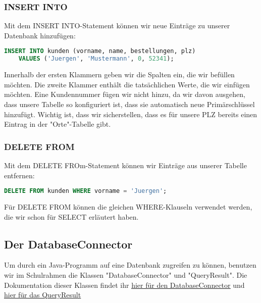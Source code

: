 \documentclass{article}
\begin{document}
	\subsubsection{INSERT INTO}
	Mit dem INSERT INTO-Statement können wir neue Einträge zu unserer Datenbank hinzufügen:

	\begin{lstlisting}[language=SQL, caption=Wir fügen neue Einträge zu der Kunden-Tabelle hinzu]
	INSERT INTO kunden (vorname, name, bestellungen, plz) 
	VALUES ('Juergen', 'Mustermann', 0, 52341);
	\end{lstlisting}

	Innerhalb der ersten Klammern geben wir die Spalten ein, die wir befüllen möchten. Die zweite Klammer enthält die tatsächlichen Werte, die wir einfügen möchten. Eine Kundennummer fügen wir nicht hinzu, da wir davon ausgehen, dass unsere Tabelle so konfiguriert ist, dass sie automatisch neue Primärschlüssel hinzufügt. Wichtig ist, dass wir sicherstellen, dass es für unsere PLZ bereits einen Eintrag in der "Orte"-Tabelle gibt.

	\subsubsection{DELETE FROM}
	Mit dem DELETE FROm-Statement können wir Einträge aus unserer Tabelle entfernen:

	\begin{lstlisting}[language=SQL, caption=Wir entfernen alle Jürgens aus unserer Kundentabelle]
	DELETE FROM kunden WHERE vorname = 'Juergen';
	\end{lstlisting}

	Für DELETE FROM können die gleichen WHERE-Klauseln verwendet werden, die wir schon für SELECT erläutert haben.

	\subsection{Der DatabaseConnector}
Um durch ein Java-Programm auf eine Datenbank zugreifen zu können, benutzen wir im Schulrahmen die Klassen "DatabaseConnector" und "QueryResult". Die Dokumentation dieser Klassen findet ihr \href{https://www.schulentwicklung.nrw.de/lehrplaene/upload/klp\_SII/if/Dokumentation\_ZA-IF\_GK-LK\_ab\_2018\_2021\_12\_22.pdf#page=31}{\underline{hier für den DatabaseConnector}} und \href{https://www.schulentwicklung.nrw.de/lehrplaene/upload/klp\_SII/if/Dokumentation\_ZA-IF\_GK-LK\_ab\_2018\_2021\_12\_22.pdf#page=32}{\underline{hier für das QueryResult}}
\end{document}
